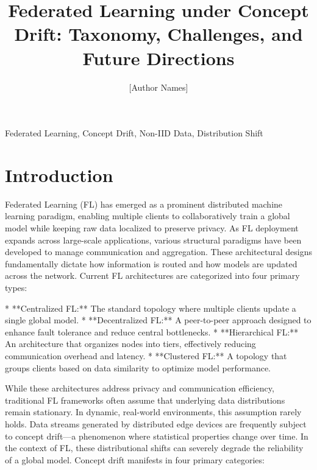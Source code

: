\documentclass[journal]{IEEEtran}
\title{Federated Learning under Concept Drift: Taxonomy, Challenges, and Future Directions}
\author{[Author Names]}
\begin{document}
\maketitle

\begin{abstract}
\end{abstract}

\begin{IEEEkeywords}Federated Learning, Concept Drift, Non-IID Data, Distribution Shift\end{IEEEkeywords}

\section{Introduction}
\label{sec:introduction}

Federated Learning (FL) has emerged as a prominent distributed machine learning paradigm, enabling multiple clients to collaboratively train a global model while keeping raw data localized to preserve privacy. As FL deployment expands across large-scale applications, various structural paradigms have been developed to manage communication and aggregation. These architectural designs fundamentally dictate how information is routed and how models are updated across the network. Current FL architectures are categorized into four primary types:

*   **Centralized FL:** The standard topology where multiple clients update a single global model.
*   **Decentralized FL:** A peer-to-peer approach designed to enhance fault tolerance and reduce central bottlenecks.
*   **Hierarchical FL:** An architecture that organizes nodes into tiers, effectively reducing communication overhead and latency.
*   **Clustered FL:** A topology that groups clients based on data similarity to optimize model performance.

While these architectures address privacy and communication efficiency, traditional FL frameworks often assume that underlying data distributions remain stationary. In dynamic, real-world environments, this assumption rarely holds. Data streams generated by distributed edge devices are frequently subject to concept drift—a phenomenon where statistical properties change over time. In the context of FL, these distributional shifts can severely degrade the reliability of a global model. Concept drift manifests in four primary categories:
\end{document}
